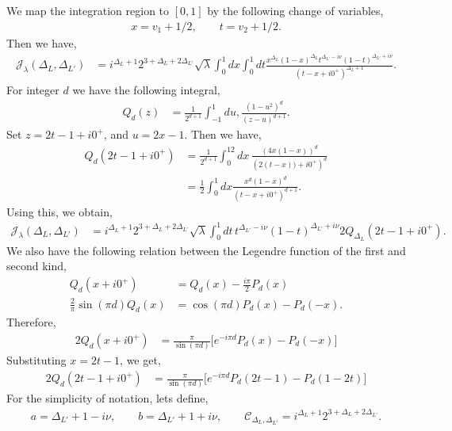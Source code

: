\documentclass[11pt]{article}
\newcommand{\lb}{\left(}
\newcommand{\rb}{\right)}
\begin{document}
We map the integration region to $[0,1]$ by the following change of variables,
\begin{align}
    x = v_1 + 1/2, \qquad t = v_2 + 1/2.
\end{align}
Then we have,
\begin{align}
    \mathcal{J}_\lambda(\Delta_L,\Delta_{L'}) &= i^{\Delta_L+1} 2^{3+ \Delta_L+ 2\Delta_{L'}} \sqrt \lambda \int_0^1 dx \int_0^1 dt \frac{x^{\Delta_L} (1-x)^{\Delta_L}t^{\Delta_{L'}- i\nu}(1-t)^{\Delta_{L'}+i\nu}}{(t-x+ i0^+)^{\Delta_L + 1}}.
\end{align}
For integer $d$ we have the following integral,
\begin{align}
    Q_d(z) &= \frac{1}{2^{d+1}}\int_{-1}^1du,\frac{(1-u^2)^d}{(z-u)^{d+1}}.
\end{align}
Set $z = 2t- 1+i0^+$, and $u = 2x-1$. Then we have, 
\begin{align}
    Q_d(2t-1+i0^+) &= \frac{1}{2^{d+1}} \int_0^12dx\, \frac{\lb  4x(1-x)\rb^d}{\lb 2(t-x)) + i0^+\rb^{d}} \\
    &= \frac{1}{2}\int_0^1dx\frac{x^d(1-x)^d}{(t-x+i0^+)^{d+1}}.
\end{align}
Using this, we obtain,
\begin{align}
    \mathcal{J}_\lambda(\Delta_L,\Delta_{L'}) &= i^{\Delta_L+1} 2^{3+ \Delta_L+ 2\Delta_{L'}}\sqrt \lambda \int_0^1 dt\,
    t^{\Delta_{L'}-i\nu}(1-t)^{\Delta_{L'}+i\nu}2Q_{\Delta_L}(2t-1+i0^+).
\end{align}
We also have the following relation between the Legendre function of the first and second kind,
\begin{align}
    Q_d(x+ i0^+) &= Q_d(x) - \frac{i \pi }{2}P_d(x) \\
    \frac{2}{\pi} \sin(\pi d) Q_d(x) &= \cos(\pi d) P_d(x) - P_d(-x).
\end{align}
Therefore,
\begin{align}
    2Q_d(x+i0^+) &= \frac{\pi }{\sin (\pi d)} \big[e^{-i\pi d} P_d(x) - P_d(-x) \big]
\end{align}
Substituting $x = 2t-1$, we get,
\begin{align}
    2Q_d(2t- 1+i0^+) &= \frac{\pi }{\sin (\pi d)} \big[e^{-i\pi d} P_d(2t-1) - P_d(1-2t) \big]
\end{align}
For the simplicity of notation, lets define,
\begin{align}
    a = \Delta_{L'}+1-i\nu, \qquad b = \Delta_{L'}+1+i\nu, \qquad \mathcal{C}_{\Delta_L,\Delta_{L'}} = i^{\Delta_L+1}2^{3+ \Delta_L+ 2\Delta_{L'}}.
\end{align}
\end{document}
